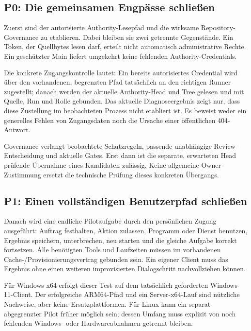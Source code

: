 \begin{cols}
\subsection*{P0: Die gemeinsamen Engpässe schließen}
Zuerst sind der autorisierte Authority-Lesepfad und die wirksame Repository-Governance zu etablieren. Dabei bleiben sie zwei getrennte Gegenstände. Ein Token, der Quellbytes lesen darf, erteilt nicht automatisch administrative Rechte. Ein geschützter Main liefert umgekehrt keine fehlenden Authority-Credentials.

Die konkrete Zugangskontrolle lautet: Ein bereits autorisiertes Credential wird über den vorhandenen, begrenzten Pfad tatsächlich an den richtigen Runner zugestellt; danach werden der aktuelle Authority-Head und Tree gelesen und mit Quelle, Run und Rolle gebunden. Das aktuelle Diagnoseergebnis zeigt nur, dass diese Zustellung im beobachteten Prozess nicht etabliert ist. Es beweist weder ein generelles Fehlen von Zugangsdaten noch die Ursache einer öffentlichen 404-Antwort. 

Governance verlangt beobachtete Schutzregeln, passende unabhängige Review-Entscheidung und aktuelle Gates. Erst dann ist die separate, erwarteten Head prüfende Übernahme eines Kandidaten zulässig. Keine allgemeine Owner-Zustimmung ersetzt die technische Prüfung dieses konkreten Übergangs. 

\subsection*{P1: Einen vollständigen Benutzerpfad schließen}
Danach wird eine endliche Pilotaufgabe durch den persönlichen Zugang ausgeführt: Auftrag festhalten, Aktion zulassen, Programm oder Dienst benutzen, Ergebnis speichern, unterbrechen, neu starten und die gleiche Aufgabe korrekt fortsetzen. Alle benötigten Tools und Laufzeiten müssen im vorhandenen Cache-/Provisionierungsvertrag gebunden sein. Ein eigener Client muss das Ergebnis ohne einen weiteren improvisierten Dialogschritt nachvollziehen können. 

Für Windows x64 erfolgt dieser Test auf dem tatsächlich geforderten Windows-11-Client. Der erfolgreiche ARM64-Pfad und ein Server-x64-Lauf sind nützliche Nachweise, aber keine Ersatzplattformen. Für Linux kann ein separat abgegrenzter Pilot früher möglich sein; dessen Umfang muss explizit von noch fehlenden Windows- oder Hardwareabnahmen getrennt bleiben. 


\end{cols}

